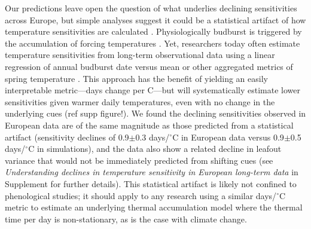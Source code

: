 \documentclass{article}
\begin{document}
\par Our predictions leave open the question of what underlies declining sensitivities across Europe, but simple analyses suggest it could be a statistical artifact of how temperature sensitivities are calculated \citep{vitasse2018,gusewell2017}. Physiologically budburst is triggered by the accumulation of forcing temperatures \citep{hanninen1995,chuine2016}. Yet, researchers today often estimate temperature sensitivities from long-term observational data using a linear regression of annual budburst date versus mean or other aggregated metrics of spring temperature \citep[e.g.,][]{Wolkovich:2012n}. This approach has the benefit of yielding an easily interpretable metric---days change per \degree C---but will systematically estimate lower sensitivities given warmer daily temperatures, even with no change in the underlying cues (ref supp figure!). We found the declining sensitivities observed in European data are of the same magnitude as those predicted from a statistical artifact (sensitivity declines of 0.9$\pm$0.3 days/$^{\circ}$C in European data versus 0.9$\pm$0.5 days/$^{\circ}$C in simulations), and the data also show a related decline in leafout variance that would not be immediately predicted from shifting cues (see \emph{Understanding declines in temperature sensitivity in European long-term data} in Supplement for further details). This statistical artifact is likely not confined to phenological studies; it should apply to any research using a similar days/$^{\circ}$C metric to estimate an underlying thermal accumulation model where the thermal time per day is non-stationary, as is the case with climate change. 
\end{document}
